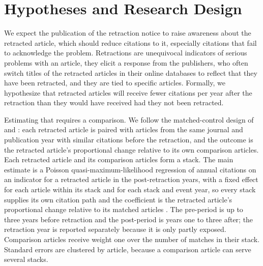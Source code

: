 \documentclass[11pt,letterpaper]{article}
\begin{document}
\section{Hypotheses and Research Design}
We expect the publication of the retraction notice to raise awareness about the retracted article, which should reduce citations to it, especially citations that fail to acknowledge the problem. Retractions are unequivocal indicators of serious problems with an article, they elicit a response from the publishers, who often switch titles of the retracted articles in their online databases to reflect that they have been retracted, and they are tied to specific articles. Formally, we hypothesize that retracted articles will receive fewer citations per year after the retraction than they would have received had they not been retracted.

Estimating that requires a comparison. We follow the matched-control design of \citet{furman2012} and \citet{azoulay2015}: each retracted article is paired with articles from the same journal and publication year with similar citations before the retraction, and the outcome is the retracted article's proportional change relative to its own comparison articles. Each retracted article and its comparison articles form a stack. The main estimate is a Poisson quasi-maximum-likelihood regression of annual citations on an indicator for a retracted article in the post-retraction years, with a fixed effect for each article within its stack and for each stack and event year, so every stack supplies its own citation path and the coefficient is the retracted article's proportional change relative to its matched articles \citep{wooldridge2023,chen2024,berge2018}. The pre-period is up to three years before retraction and the post-period is years one to three after; the retraction year is reported separately because it is only partly exposed. Comparison articles receive weight one over the number of matches in their stack. Standard errors are clustered by article, because a comparison article can serve several stacks.
\end{document}
